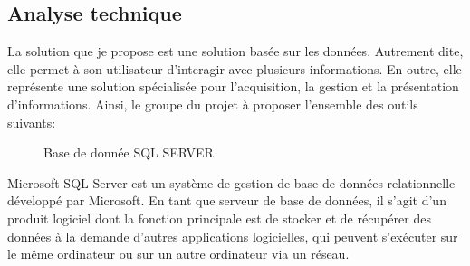 \documentclass[a4paper]{report}
\begin{document}
\begin{doublespace}
	\section{Analyse technique}
	La solution que je propose est une solution basée sur les données.
	Autrement dite, elle permet à son utilisateur d'interagir avec plusieurs
	informations. En outre, elle représente une solution spécialisée pour
	l'acquisition, la gestion et la présentation d'informations. Ainsi, le groupe du projet à proposer l'ensemble des outils suivants:
	\begin{figure}[H]
		\begin{center}
			\caption{Base de donnée SQL SERVER}
		\end{center}
	\end{figure}
	Microsoft SQL Server est un système de gestion
	de base de données relationnelle développé
	par Microsoft. En tant que serveur de base de
	données, il s'agit d'un produit logiciel dont la
	fonction principale est de stocker et de
	récupérer des données à la demande d'autres
	applications logicielles, qui peuvent
	s'exécuter sur le même ordinateur ou sur un
	autre ordinateur via un réseau.
	\begin{figure}[H]
		\begin{center}

\end{center}
\end{figure}
\end{doublespace}
\end{document}
